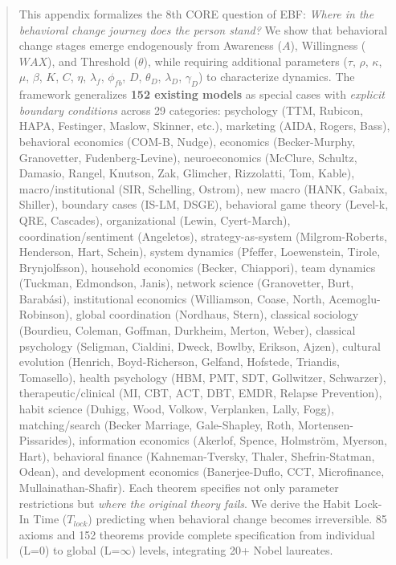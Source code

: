 \begin{abstract}
This appendix formalizes the 8th CORE question of EBF: \textit{Where in the behavioral change journey does the person stand?} We show that behavioral change stages emerge endogenously from Awareness ($A$), Willingness ($WAX$), and Threshold ($\theta$), while requiring additional parameters ($\tau$, $\rho$, $\kappa$, $\mu$, $\beta$, $K$, $C$, $\eta$, $\lambda_f$, $\phi_{fb}$, $D$, $\theta_D$, $\lambda_D$, $\gamma_D$) to characterize dynamics. The framework generalizes \textbf{152 existing models} as special cases with \textit{explicit boundary conditions} across 29 categories: psychology (TTM, Rubicon, HAPA, Festinger, Maslow, Skinner, etc.), marketing (AIDA, Rogers, Bass), behavioral economics (COM-B, Nudge), economics (Becker-Murphy, Granovetter, Fudenberg-Levine), neuroeconomics (McClure, Schultz, Damasio, Rangel, Knutson, Zak, Glimcher, Rizzolatti, Tom, Kable), macro/institutional (SIR, Schelling, Ostrom), new macro (HANK, Gabaix, Shiller), boundary cases (IS-LM, DSGE), behavioral game theory (Level-k, QRE, Cascades), organizational (Lewin, Cyert-March), coordination/sentiment (Angeletos), strategy-as-system (Milgrom-Roberts, Henderson, Hart, Schein), system dynamics (Pfeffer, Loewenstein, Tirole, Brynjolfsson), household economics (Becker, Chiappori), team dynamics (Tuckman, Edmondson, Janis), network science (Granovetter, Burt, Barabási), institutional economics (Williamson, Coase, North, Acemoglu-Robinson), global coordination (Nordhaus, Stern), classical sociology (Bourdieu, Coleman, Goffman, Durkheim, Merton, Weber), classical psychology (Seligman, Cialdini, Dweck, Bowlby, Erikson, Ajzen), cultural evolution (Henrich, Boyd-Richerson, Gelfand, Hofstede, Triandis, Tomasello), health psychology (HBM, PMT, SDT, Gollwitzer, Schwarzer), therapeutic/clinical (MI, CBT, ACT, DBT, EMDR, Relapse Prevention), habit science (Duhigg, Wood, Volkow, Verplanken, Lally, Fogg), matching/search (Becker Marriage, Gale-Shapley, Roth, Mortensen-Pissarides), information economics (Akerlof, Spence, Holmström, Myerson, Hart), behavioral finance (Kahneman-Tversky, Thaler, Shefrin-Statman, Odean), and development economics (Banerjee-Duflo, CCT, Microfinance, Mullainathan-Shafir). Each theorem specifies not only parameter restrictions but \textit{where the original theory fails}. We derive the Habit Lock-In Time ($T_{lock}$) predicting when behavioral change becomes irreversible. 85 axioms and 152 theorems provide complete specification from individual (L=0) to global (L=$\infty$) levels, integrating 20+ Nobel laureates.
\end{abstract}

